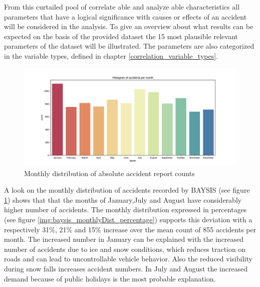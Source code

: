 \documentclass[a4paper,12pt]{report}
\begin{document}
From this curtailed pool of correlate able and analyze able characteristics all parameters that have a logical significance with causes or effects of an accident will be considered in the analysis. To give an overview about what results can be expected on the basis of the provided dataset the 15 most plausible relevant parameters of the dataset will be illustrated. The parameters are also categorized in the variable types, defined in chapter \ref{correlation_variable_types}. 

\begin{figure}[h]
	\centering
	\includegraphics[scale=0.46]{../CorrAnalysis/data/BAYSIS/dataset/plots/baysis_dataset_hist_month.pdf}
	\caption{Monthly distribution of absolute accident report counts}
	\label{img:baysis_monthlyDist_absolute}
\end{figure}


A look on the monthly distribution of accidents recorded by BAYSIS (see figure \ref{img:baysis_monthlyDist_absolute}) shows that that the months of January,July and August have considerably higher number of accidents. The monthly distribution expressed in percentages (see figure \ref{img:baysis_monthlyDist_percentage}) supports this deviation with a respectively 31\%, 21\% and 15\% increase over the mean count of 855 accidents per month. The increased number in January can be explained with the increased number of accidents due to ice and snow conditions, which reduces traction on roads and can lead to uncontrollable vehicle behavior. Also the reduced visibility during snow falls increases accident numbers. In July and August the increased demand because of public holidays is the most probable explanation.
\end{document}
